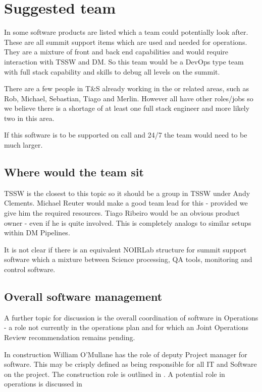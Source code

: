 \section{Suggested team} \label{sec:team}

In  some \gls{software} products are listed which a team could potentially look after.
These are all summit support items which are used and needed for operations.
They are a mixture of front and back end capabilities and would require interaction with TSSW and \gls{DM}.
So this team would be a DevOps type team with full \gls{stack} capability and skills to debug all levels on the summit.

There are a few people in T\&S already working in the or related areas, such as Rob, Michael, Sebastian, Tiago and Merlin.
However all have other roles/jobs so we believe there is a shortage of at least one full \gls{stack} engineer and more likely two in this area.


If this \gls{software} is to be supported on call and 24/7 the team would need to be much larger.


\subsection{Where would the team sit}
TSSW is the closest to this topic so it should be a group in TSSW under Andy Clements.
Michael Reuter would make a good team lead for this - provided we give him the required resources.
Tiago Ribeiro would be an obvious product owner - even if he is quite involved.
This is completely analogs to similar setups within DM Pipelines.

It is not clear if there is an equivalent \gls{NOIRLab} structure for summit support \gls{software} which
a mixture between Science processing, \gls{QA} tools, \gls{monitoring} and control software.

\subsection{Overall software management}
A further topic for discussion is the overall coordination of software in \VRO  \gls{Operations} - a role not currently in the operations plan and for which an Joint \gls{Operations} \gls{Review} recommendation remains pending.

In construction William O'Mullane has the role of deputy Project manager for software.  This may be  crisply defined as being responsible for all IT and Software on the project.
The construction role is outlined in  .
A potential role in operations is discussed in 


